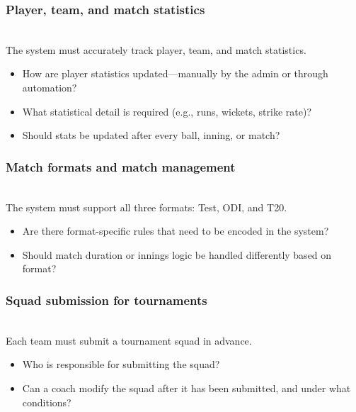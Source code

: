 \subsubsection{Player, team, and match statistics}\label{LrV9x8wla_x0ipgAWFefy}
\\
The system must accurately track player, team, and match statistics.

\begin{itemize}
\item
\protect{}\label{bCwLxe3cptwDUQm87YifE}
How are player statistics updated---manually by the admin or through automation?
\item
\protect{}\label{M_1MgQbbCmSjfbcqcG1jn}
What statistical detail is required (e.g., runs, wickets, strike rate)?
\item
\protect{}\label{Sk-d-o0Lr7V3scGgj2KGa}
Should stats be updated after every ball, inning, or match?
\end{itemize}

\subsubsection{Match formats and match management}\label{29VSaRKtpoMuMItGXEwF_}
\\
The system must support all three formats: Test, ODI, and T20.

\begin{itemize}
\item
\protect{}\label{PFEOujtOW1qMHPuEM-YQi}
Are there format-specific rules that need to be encoded in the system?
\item
\protect{}\label{0WjJ2NnvCw3odMPNW8c6v}
Should match duration or innings logic be handled differently based on format?
\end{itemize}

\subsubsection{Squad submission for tournaments}\label{F3fzr1iSpc-e4wJjOtY5g}
\\
Each team must submit a tournament squad in advance.

\begin{itemize}
\item
\protect{}\label{w3Wm1ASJh__urW9JoeFAq}
Who is responsible for submitting the squad?
\item
\protect{}\label{H9-gM1jqigPrFy6eAhqRb}
Can a coach modify the squad after it has been submitted, and under what conditions?
\end{itemize}

